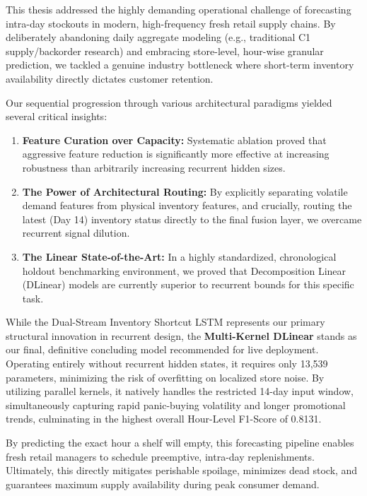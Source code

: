 This thesis addressed the highly demanding operational challenge of forecasting intra-day stockouts in modern, high-frequency fresh retail supply chains. By deliberately abandoning daily aggregate modeling (e.g., traditional C1 supply/backorder research) and embracing store-level, hour-wise granular prediction, we tackled a genuine industry bottleneck where short-term inventory availability directly dictates customer retention.

Our sequential progression through various architectural paradigms yielded several critical insights:
\begin{enumerate}
    \item \textbf{Feature Curation over Capacity:} Systematic ablation proved that aggressive feature reduction is significantly more effective at increasing robustness than arbitrarily increasing recurrent hidden sizes.
    \item \textbf{The Power of Architectural Routing:} By explicitly separating volatile demand features from physical inventory features, and crucially, routing the latest (Day 14) inventory status directly to the final fusion layer, we overcame recurrent signal dilution.
    \item \textbf{The Linear State-of-the-Art:} In a highly standardized, chronological holdout benchmarking environment, we proved that Decomposition Linear (DLinear) models are currently superior to recurrent bounds for this specific task. 
\end{enumerate}

While the Dual-Stream Inventory Shortcut LSTM represents our primary structural innovation in recurrent design, the \textbf{Multi-Kernel DLinear} stands as our final, definitive concluding model recommended for live deployment. Operating entirely without recurrent hidden states, it requires only 13,539 parameters, minimizing the risk of overfitting on localized store noise. By utilizing parallel kernels, it natively handles the restricted 14-day input window, simultaneously capturing rapid panic-buying volatility and longer promotional trends, culminating in the highest overall Hour-Level F1-Score of 0.8131. 

By predicting the exact hour a shelf will empty, this forecasting pipeline enables fresh retail managers to schedule preemptive, intra-day replenishments. Ultimately, this directly mitigates perishable spoilage, minimizes dead stock, and guarantees maximum supply availability during peak consumer demand.
